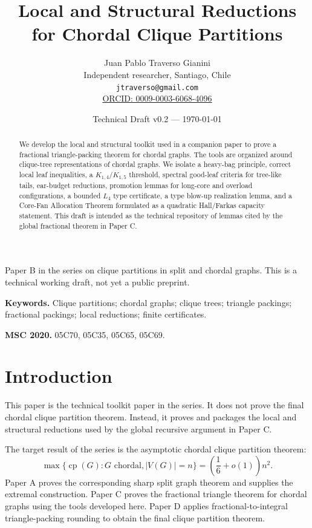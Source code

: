 \documentclass[11pt]{article}
\title{Local and Structural Reductions for Chordal Clique Partitions}
\author{Juan Pablo Traverso Gianini\\
Independent researcher, Santiago, Chile\\
\texttt{jtraverso@gmail.com}\\
\href{https://orcid.org/0009-0003-6068-4096}{ORCID: 0009-0003-6068-4096}}
\date{Technical Draft v0.2 --- \today}
\theoremstyle{definition}
\newcommand{\cp}{\operatorname{cp}}
\begin{document}
\maketitle

\begin{center}
{\small Paper B in the series on clique partitions in split and chordal graphs. This is a technical working draft, not yet a public preprint.}
\end{center}

\noindent\textbf{Keywords.}
Clique partitions; chordal graphs; clique trees; triangle packings; fractional packings; local reductions; finite certificates.

\medskip

\noindent\textbf{MSC 2020.}
05C70, 05C35, 05C65, 05C69.

\begin{abstract}
We develop the local and structural toolkit used in a companion paper to prove a fractional triangle-packing theorem for chordal graphs. The tools are organized around clique-tree representations of chordal graphs. We isolate a heavy-bag principle, correct local leaf inequalities, a \(K_{1,4}/K_{1,5}\) threshold, spectral good-leaf criteria for tree-like tails, ear-budget reductions, promotion lemmas for long-core and overload configurations, a bounded \(L_4\) type certificate, a type blow-up realization lemma, and a Core-Fan Allocation Theorem formulated as a quadratic Hall/Farkas capacity statement. This draft is intended as the technical repository of lemmas cited by the global fractional theorem in Paper C.
\end{abstract}

\tableofcontents

\section{Introduction}

This paper is the technical toolkit paper in the series. It does not prove the final chordal clique partition theorem. Instead, it proves and packages the local and structural reductions used by the global recursive argument in Paper C.

The target result of the series is the asymptotic chordal clique partition theorem:
\[
    \max\{\cp(G):G\text{ chordal}, |V(G)|=n\}
    =
    \left(\frac16+o(1)\right)n^2.
\]
Paper A proves the corresponding sharp split graph theorem and supplies the extremal construction. Paper C proves the fractional triangle theorem for chordal graphs using the tools developed here. Paper D applies fractional-to-integral triangle-packing rounding to obtain the final clique partition theorem.
\end{document}
